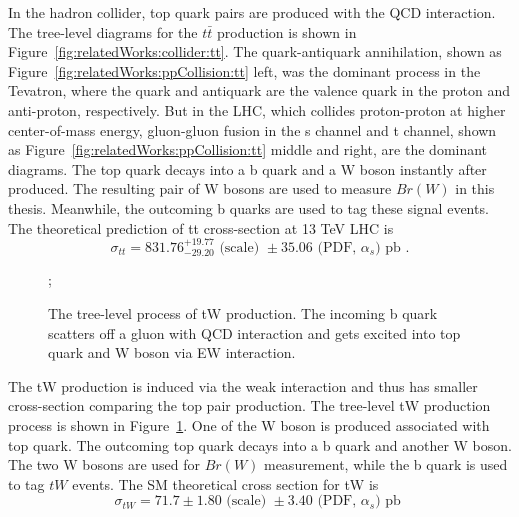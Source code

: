 \noindent In the hadron collider, top quark pairs are produced with the QCD interaction. The tree-level diagrams for the $t\bar{t}$ production is shown in Figure~\ref{fig:relatedWorks:collider:tt}. The quark-antiquark annihilation, shown as Figure~\ref{fig:relatedWorks:ppCollision:tt} left, was the dominant process in the Tevatron, where the quark and antiquark are the valence quark in the proton and anti-proton, respectively. But in the LHC, which collides proton-proton at higher center-of-mass energy, gluon-gluon fusion in the s channel and t channel, shown as  Figure~\ref{fig:relatedWorks:ppCollision:tt} middle and right, are the dominant diagrams. The top quark decays into a b quark and a W boson instantly after produced. The resulting pair of W bosons are used to measure $Br(W)$ in this thesis. Meanwhile, the outcoming b quarks are used to tag these signal events. The theoretical prediction of tt cross-section at 13 TeV LHC is
\begin{equation}
    \sigma_{tt} = 831.76 ^{+19.77}_{-29.20} \text{ (scale) } \pm 35.06 \text{ (PDF, $\alpha_s$) pb } .
\end{equation}



\begin{figure}[ht]
    \centering
    ; \qquad
    \caption{The tree-level process of tW production. The incoming b quark scatters off a gluon with QCD interaction and gets excited into top quark and W boson via EW interaction.}
    \label{fig:relatedWorks:ppCollision:tw}
\end{figure}

\noindent The tW production is induced via the weak interaction and thus has smaller cross-section comparing the top pair production. The tree-level tW production process is shown in Figure~\ref{fig:relatedWorks:ppCollision:tw}. One of the W boson is produced associated with top quark. The outcoming top quark decays into a b quark and another W boson. The two W bosons are used for  $Br(W)$ measurement, while the b quark is used to tag $tW$ events. The SM theoretical cross section for tW is 
\begin{equation}
    \sigma_{tW} = 71.7 \pm 1.80 \text{ (scale) } \pm 3.40  \text{ (PDF, $\alpha_s$) pb }
\end{equation}


